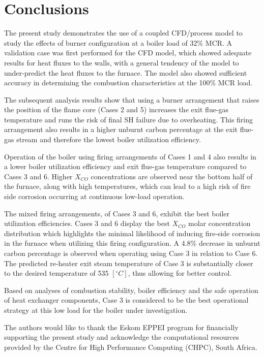 \documentclass[11pt,cleanfoot]{asme2ej}
\begin{document}
\section{Conclusions}
The present study demonstrates the use of a coupled CFD/process model to study the effects of burner configuration at a boiler load of 32\% MCR. A validation case was first performed for the CFD model, which showed adequate results for heat fluxes to the walls, with a general tendency of the model to under-predict the heat fluxes to the furnace. The model also showed sufficient accuracy in determining the combustion characteristics at the 100\% MCR load. 

The subsequent analysis results show that using a burner arrangement that raises the position of the flame core (Cases 2 and 5) increases the exit flue-gas temperature and runs the risk of final SH failure due to overheating. This firing arrangement also results in a higher unburnt carbon percentage at the exit flue-gas stream and therefore the lowest boiler utilization efficiency. 

Operation of the boiler using firing arrangements of Cases 1 and 4 also results in a lower boiler utilization efficiency and exit flue-gas temperature compared to Cases 3 and 6. Higher $X_{CO}$ concentrations are observed near the bottom half of the furnace, along with high temperatures, which can lead to a high risk of fire side corrosion occurring at continuous low-load operation. 

The mixed firing arrangements, of Cases 3 and 6, exhibit the best boiler utilization efficiencies. Cases 3 and 6 display the best $X_{CO}$ molar concentration distribution which highlights the minimal likelihood of inducing fire-side corrosion in the furnace when utilizing this firing configuration. A 4.8\% decrease in unburnt carbon percentage is observed when operating using Case 3 in relation to Case 6. The predicted re-heater exit steam temperature of Case 3 is substantially closer to the desired temperature of 535 $[^\circ C]$, thus allowing for better control.

Based on analyses of combustion stability, boiler efficiency and the safe operation of heat exchanger components, Case 3 is considered to be the best operational strategy at this low load for the boiler under investigation.
\begin{acknowledgment}
The authors would like to thank the Eskom EPPEI program for financially supporting the present study and acknowledge the computational resources provided by the Centre for High Performance Computing (CHPC), South Africa.
\end{acknowledgment}
\end{document}
